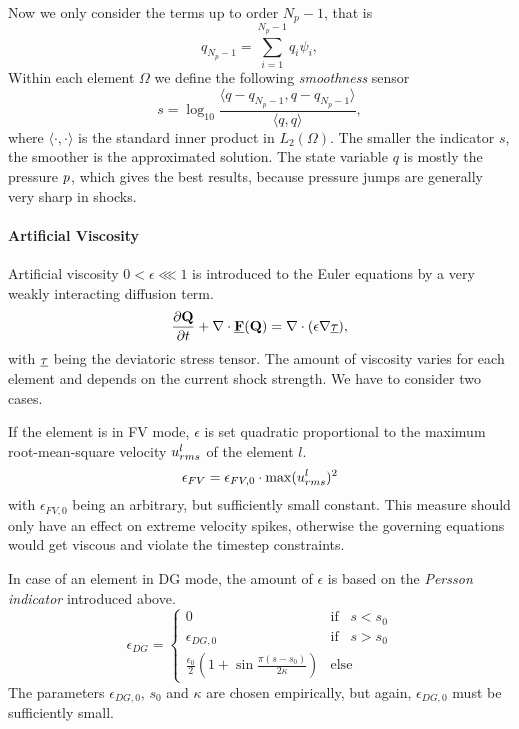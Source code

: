 Now we only consider the terms up to order $N_p-1$, that is
\begin{equation}
    q_{N_p-1} = \sum^{N_p-1}_{i=1} q_i \psi_i,
\end{equation}
Within each element $\Omega$ we define the following \emph{smoothness} sensor
\begin{equation}
\label{eqn:smoothness-indicator}
    s = \log_{10} \frac{\langle q - q_{N_p-1}, q - q_{N_p-1} \rangle}{\langle q, q \rangle},
\end{equation}
where $\langle \cdot,\cdot \rangle$ is the standard inner product in $L_2(\Omega)$.
The smaller the indicator $s$, the smoother is the approximated solution.
The state variable $q$ is mostly the pressure $p$, which gives the best
results, because pressure jumps are generally very sharp in shocks.

\paragraph{Artificial Viscosity}
Artificial viscosity $0 < \epsilon \lll 1$ is introduced to the Euler equations
by a very weakly interacting diffusion term.
\begin{equation}
\label{eqn:persson-indicator-gov-equ}
    \frac{\partial\mathbf{Q}}{\partial t} + \nabla \cdot \underline{\mathbf{F}}(\mathbf{Q}) = \nabla \cdot (\epsilon \nabla \underline{\mathbf{\tau}}),
\end{equation}
with $\underline{\mathbf{\tau}}$ being the deviatoric stress tensor. The amount of viscosity
varies for each element and depends on the current shock strength.
We have to consider two cases.

If the element is in FV mode, $\epsilon$ is set quadratic proportional to the
maximum root-mean-square velocity $u^l_{rms}$ of the element $l$.
\begin{equation}
    \epsilon_{FV} = \epsilon_{FV,0} \cdot \max(u^l_{rms})^2
\end{equation}
with $\epsilon_{FV,0}$ being an arbitrary, but sufficiently small constant.
This measure should only have an effect on extreme velocity spikes, otherwise
the governing equations would get viscous and violate the timestep constraints.

In case of an element in DG mode, the amount of $\epsilon$ is based on the
\emph{Persson indicator} introduced above.
\begin{equation}
    \epsilon_{DG} = \begin{cases}
        0 & \text{if}\;\;\; s < s_0 \\
        \epsilon_{DG,0} & \text{if}\;\;\; s > s_0 \\
        \frac{\epsilon_0}{2} \left ( 1 + \sin\frac{\pi(s-s_0)}{2\kappa} \right ) & \text{else}
    \end{cases}
\end{equation}
The parameters $\epsilon_{DG,0}$, $s_0$ and $\kappa$ are chosen empirically,
but again, $\epsilon_{DG,0}$ must be sufficiently small.

